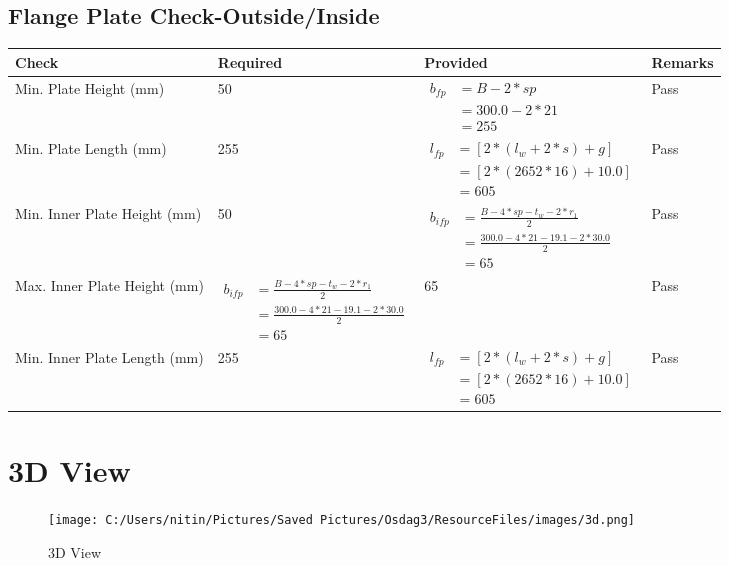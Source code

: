 \documentclass{article}%
\begin{document}
%
\newpage%
\subsection{Flange Plate Check{-}Outside/Inside}%
\label{subsec:FlangePlateCheck{-}Outside/Inside}%
\renewcommand{\arraystretch}{1.2}%
\begin{longtable}{|p{4cm}|p{6cm}|p{5.5cm}|p{1.5cm}|}%
\hline%
\rowcolor{OsdagGreen}%
Check&Required&Provided&Remarks\\%
\hline%
\endhead%
\hline%
Min. Plate Height (mm)&50&$\begin{aligned} b_{fp} &= {B - 2*sp} \\ &= {300.0 - 2 * 21} \\ &=255\end{aligned}$&Pass\\%
\hline%
Min. Plate Length (mm)&255&$\begin{aligned} l_{fp} & = [2*(l_{w} + 2*s) + g]\\ &= [2*(2652*16) +10.0]\\ &=605\end{aligned}$&Pass\\%
\hline%
Min. Inner Plate Height (mm)&50&$\begin{aligned} b_{ifp} &= \frac{B - 4*sp - t_w - 2*r_1}{2} \\ &= \frac{300.0- 4*21-19.1- 2*30.0} {2} \\ &=65\end{aligned}$&Pass\\%
\hline%
Max. Inner Plate Height (mm)&$\begin{aligned} b_{ifp} &= \frac{B - 4*sp - t_w - 2*r_1}{2} \\ &= \frac{300.0- 4*21-19.1- 2*30.0} {2} \\ &=65\end{aligned}$&65&Pass\\%
\hline%
Min. Inner Plate Length (mm)&255&$\begin{aligned} l_{fp} & = [2*(l_{w} + 2*s) + g]\\ &= [2*(2652*16) +10.0]\\ &=605\end{aligned}$&Pass\\%
\hline%
\end{longtable}

%
%
\newpage%
\section{3D View}%
\label{sec:3DView}%


\begin{figure}[h!]%
\centering%
\texttt{[image: C:/Users/nitin/Pictures/Saved Pictures/Osdag3/ResourceFiles/images/3d.png]}%
\caption{3D View}%
\end{figure}

%
\end{document}
